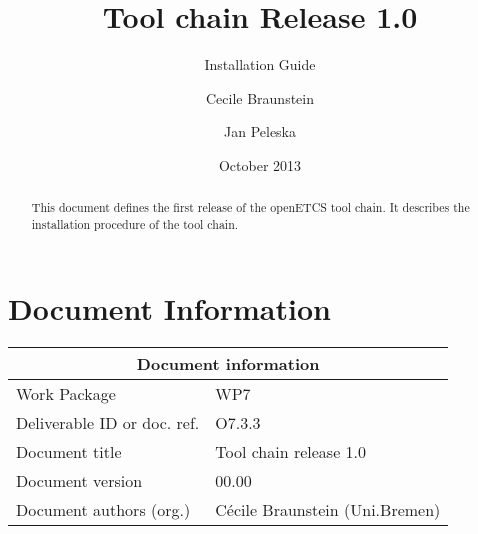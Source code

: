 \documentclass{openetcs_report}
\begin{document}
\frontmatter
{}




\title{Tool chain Release 1.0}

\subtitle{Installation Guide}

\date{October 2013}


\author{Cecile Braunstein \and Jan Peleska}







\begin{abstract}
This document defines the first release of the openETCS tool chain. It
describes the installation procedure of the tool chain.
\end{abstract}

\maketitle
\tableofcontents
\listoffiguresandtables

\newpage

\chapter{Document Information}
\begin{tabular}{|p{4.4cm}|p{8.7cm}|}
\hline
\multicolumn{2}{|c|}{Document information} \\
\hline
Work Package &  WP7  \\
Deliverable ID or doc. ref. & O7.3.3\\
\hline
Document title & Tool chain release 1.0 \\
Document version & 00.00 \\
Document authors (org.)  & Cécile Braunstein  (Uni.Bremen)  \\
\hline
\end{tabular}
\end{document}
